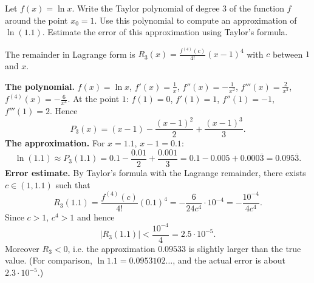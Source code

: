 
\begin{question}
Let $f(x)=\ln x$. Write the Taylor polynomial of degree 3 of the function $f$ around the point $x_0=1$. Use this polynomial to compute an approximation of $\ln(1.1)$. Estimate the error of this approximation using Taylor's formula.
\end{question}

\begin{hint}
The remainder in Lagrange form is $R_3(x)=\frac{f^{(4)}(c)}{4!}(x-1)^4$ with $c$ between $1$ and $x$.
\end{hint}

\begin{solution}
\textbf{The polynomial.} $f(x)=\ln x$, $f'(x)=\frac1x$, $f''(x)=-\frac1{x^2}$, $f'''(x)=\frac2{x^3}$, $f^{(4)}(x)=-\frac6{x^4}$. At the point $1$: $f(1)=0$, $f'(1)=1$, $f''(1)=-1$, $f'''(1)=2$. Hence
\[ P_3(x)=(x-1)-\frac{(x-1)^2}{2}+\frac{(x-1)^3}{3}. \]
\textbf{The approximation.} For $x=1.1$, $x-1=0.1$:
\[ \ln(1.1)\approx P_3(1.1)=0.1-\frac{0.01}{2}+\frac{0.001}{3}=0.1-0.005+0.000\overline{3}=0.095\overline{3}. \]
\textbf{Error estimate.} By Taylor's formula with the Lagrange remainder, there exists $c\in(1,1.1)$ such that
\[ R_3(1.1)=\frac{f^{(4)}(c)}{4!}(0.1)^4=-\frac{6}{24c^4}\cdot10^{-4}=-\frac{10^{-4}}{4c^4}. \]
Since $c>1$, $c^4>1$ and hence
\[ |R_3(1.1)|<\frac{10^{-4}}{4}=2.5\cdot10^{-5}. \]
Moreover $R_3<0$, i.e. the approximation $0.09533$ is slightly larger than the true value. (For comparison, $\ln1.1=0.0953102\ldots$, and the actual error is about $2.3\cdot10^{-5}$.)
\end{solution}

